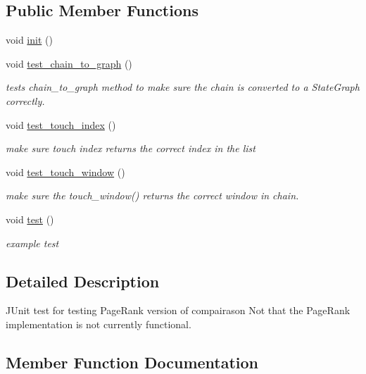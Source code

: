 \subsection*{Public Member Functions}
\begin{DoxyCompactItemize}
\item 
void \hyperlink{classtest_1_1_unit_compare_chains_rank_ab7ae1a458472adfbab1bad8059935793}{init} ()
\item 
void \hyperlink{classtest_1_1_unit_compare_chains_rank_a8232052f40f79380b50564cdb2606421}{test\+\_\+chain\+\_\+to\+\_\+graph} ()
\begin{DoxyCompactList}\small\item\em tests chain\+\_\+to\+\_\+graph method to make sure the chain is converted to a State\+Graph correctly. \end{DoxyCompactList}\item 
void \hyperlink{classtest_1_1_unit_compare_chains_rank_a523ac7aa11a1b7632cd74ee00bea158b}{test\+\_\+touch\+\_\+index} ()
\begin{DoxyCompactList}\small\item\em make sure touch index returns the correct index in the list \end{DoxyCompactList}\item 
void \hyperlink{classtest_1_1_unit_compare_chains_rank_afe149cf20ab27d623f421175b92c3d88}{test\+\_\+touch\+\_\+window} ()
\begin{DoxyCompactList}\small\item\em make sure the touch\+\_\+window() returns the correct window in chain. \end{DoxyCompactList}\item 
void \hyperlink{classtest_1_1_unit_compare_chains_rank_a5a67766addc36792cf35a251dd0b6aee}{test} ()
\begin{DoxyCompactList}\small\item\em example test \end{DoxyCompactList}\end{DoxyCompactItemize}


\subsection{Detailed Description}
J\+Unit test for testing Page\+Rank version of compairason Not that the Page\+Rank implementation is not currently functional. 

\subsection{Member Function Documentation}
